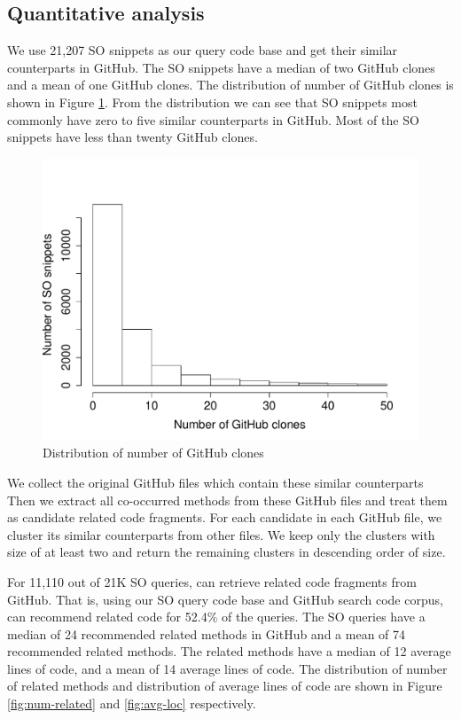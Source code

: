 \subsection{Quantitative analysis}

We use 21,207 SO snippets as our query code base and get their similar counterparts in GitHub. 
The SO snippets have a median of two GitHub clones and a mean of one GitHub clones. The distribution of number of GitHub clones is shown in Figure \ref{fig:num-clone}. From the distribution we can see that SO snippets most commonly have zero to five similar counterparts in GitHub. Most of the SO snippets have less than twenty GitHub clones.

\begin{figure}
	\includegraphics[scale=0.4]{figures/dist-gh-clone.pdf}
	\caption{Distribution of number of GitHub clones}
	\label{fig:num-clone}
\end{figure}

We collect the original GitHub files which contain these similar counterparts Then we extract all co-occurred methods from these GitHub files and treat them as candidate related code fragments. For each candidate in each GitHub file, we cluster its similar counterparts from other files. We keep only the clusters with size of at least two and return the remaining clusters in descending order of size.

For 11,110 out of 21K SO queries, {\tool} can retrieve related code fragments from GitHub. That is, using our SO query code base and GitHub search code corpus, {\tool} can recommend related code for 52.4\% of the queries. The SO queries have a median of 24 recommended related methods in GitHub and a mean of 74 recommended related methods. The related methods have a median of 12 average lines of code, and a mean of 14 average lines of code. The distribution of number of related methods and distribution of average lines of code are shown in Figure \ref{fig:num-related} and \ref{fig:avg-loc} respectively.

